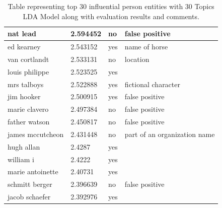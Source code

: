 \documentclass[letterpaper,11pt]{report}
\begin{document}
\begin{table}[h]
\begin{tabular}{|l|l|p{3cm}|p{3cm}|}
nat lead         & 2.594452 & no                 & false positive                       \\ \hline
ed kearney       & 2.543152 & yes                & name of horse                        \\ \hline
van cortlandt    & 2.533131 & no                 & location                             \\ \hline
louis philippe   & 2.523525 & yes                &                                      \\ \hline
mrs talboys      & 2.522888 & yes                & fictional character                  \\ \hline
jim hooker       & 2.500915 & yes                & false positive                       \\ \hline
marie clavero    & 2.497384 & no                 & false positive                       \\ \hline
father watson    & 2.450817 & no                 & false positive                       \\ \hline
james mccutcheon & 2.431448 & no                 & part of an organization name                      \\ \hline
hugh allan       & 2.4287   & yes                &                                      \\ \hline
william i        & 2.4222   & yes                &                                      \\ \hline
marie antoinette & 2.40731  & yes                &                                      \\ \hline
schmitt berger   & 2.396639 & no                 & false positive                       \\ \hline
jacob schaefer   & 2.392976 & yes                &                                      \\ \hline
             
\end{tabular}
\caption{Table representing top 30 influential person entities with 30 Topics LDA Model along with evaluation results and comments.}
\label{table:app1}
\end{table}



\end{document}
